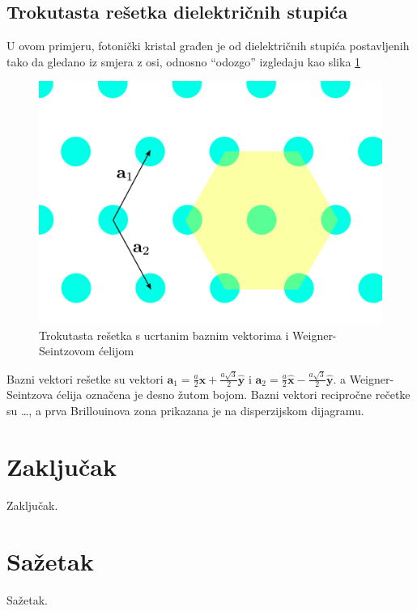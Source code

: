 \documentclass[utf8, seminar]{fer}
\begin{document}

\section{Trokutasta rešetka dielektričnih stupića}

U ovom primjeru, fotonički kristal građen je od dielektričnih stupića
postavljenih tako da gledano iz smjera z osi, odnosno ``odozgo'' izgledaju kao
slika \ref{fig:triangular_lattice}

\begin{figure}[h]
	\centering
	\includegraphics[width = 1.0\linewidth]{./images/triangular_lattice.pdf}
	\caption{Trokutasta rešetka s ucrtanim baznim vektorima i Weigner-Seintzovom
	ćelijom}
	\label{fig:triangular_lattice}
\end{figure}

Bazni vektori rešetke su vektori
${\mathbf{a}_1 = \frac{a}{2} \hat{\mathbf{x}} +
\frac{a \sqrt{3}}{2} \hat{\mathbf{y}}}$ i
${\mathbf{a}_2 = \frac{a}{2} \hat{\mathbf{x}} -
\frac{a \sqrt{3}}{2} \hat{\mathbf{y}}}$.
a Weigner-Seintzova ćelija označena je desno žutom bojom.
Bazni vektori recipročne rečetke su \dots, a prva Brillouinova zona prikazana
je na disperzijskom dijagramu.

\chapter{Zaključak}
Zaključak.




\chapter{Sažetak}
Sažetak.
\end{document}
